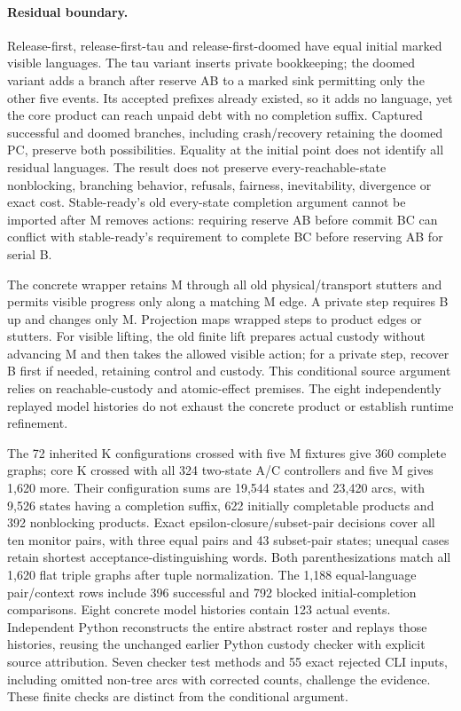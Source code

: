 \documentclass[11pt,a4paper]{article}
\theoremstyle{definition}
\theoremstyle{remark}
\begin{document}
\paragraph{Residual boundary.} Release-first, release-first-tau and release-first-doomed have equal initial marked visible languages. The tau variant inserts private bookkeeping; the doomed variant adds a branch after reserve AB to a marked sink permitting only the other five events. Its accepted prefixes already existed, so it adds no language, yet the core product can reach unpaid debt with no completion suffix. Captured successful and doomed branches, including crash/recovery retaining the doomed PC, preserve both possibilities. Equality at the initial point does not identify all residual languages. The result does not preserve every-reachable-state nonblocking, branching behavior, refusals, fairness, inevitability, divergence or exact cost. Stable-ready's old every-state completion argument cannot be imported after M removes actions: requiring reserve AB before commit BC can conflict with stable-ready's requirement to complete BC before reserving AB for serial B.

The concrete wrapper retains M through all old physical/transport stutters and permits visible progress only along a matching M edge. A private step requires B up and changes only M. Projection maps wrapped steps to product edges or stutters. For visible lifting, the old finite lift prepares actual custody without advancing M and then takes the allowed visible action; for a private step, recover B first if needed, retaining control and custody. This conditional source argument relies on reachable-custody and atomic-effect premises. The eight independently replayed model histories do not exhaust the concrete product or establish runtime refinement.

The 72 inherited K configurations crossed with five M fixtures give 360 complete graphs; core K crossed with all 324 two-state A/C controllers and five M gives 1,620 more. Their configuration sums are 19,544 states and 23,420 arcs, with 9,526 states having a completion suffix, 622 initially completable products and 392 nonblocking products. Exact epsilon-closure/subset-pair decisions cover all ten monitor pairs, with three equal pairs and 43 subset-pair states; unequal cases retain shortest acceptance-distinguishing words. Both parenthesizations match all 1,620 flat triple graphs after tuple normalization. The 1,188 equal-language pair/context rows include 396 successful and 792 blocked initial-completion comparisons. Eight concrete model histories contain 123 actual events. Independent Python reconstructs the entire abstract roster and replays those histories, reusing the unchanged earlier Python custody checker with explicit source attribution. Seven checker test methods and 55 exact rejected CLI inputs, including omitted non-tree arcs with corrected counts, challenge the evidence. These finite checks are distinct from the conditional argument.
\end{document}
